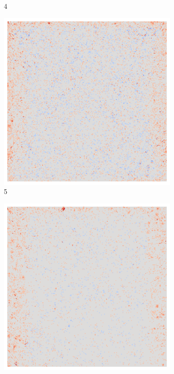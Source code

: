 \begin{figure}[ht!]
\begin{subfigure}{0.095\linewidth}
        \caption{4}
    \end{subfigure}\hfill%
    \begin{subfigure}{0.095\linewidth}
        \centering
        \includegraphics[height=1\linewidth]{01-images/05-resultate/uap_resnet/uap0-resnet18-mri-n200-robustificationslevel5.png}
        \caption{5}
    \end{subfigure}\hfill%
    \begin{subfigure}{0.095\linewidth}
        \centering
        \includegraphics[height=1\linewidth]{01-images/05-resultate/uap_resnet/uap0-resnet18-mri-n200-robustificationslevel6.png}

\end{subfigure}
\end{figure}
